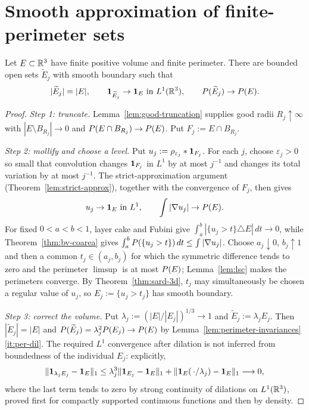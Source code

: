 \chapter{Smooth approximation of finite-perimeter sets}\label{ch:smooth-approx}

\begin{theorem}
\label{thm:smooth-approx}
Let $E\subset\mathbb R^3$ have finite positive volume and finite perimeter.  There
are bounded open sets $\widetilde E_j$ with smooth boundary such that
\[
  |\widetilde E_j|=|E|,
  \qquad
  \mathbf 1_{\widetilde E_j}\to\mathbf 1_{E}\ \text{in }L^1(\mathbb R^3),
  \qquad
  P(\widetilde E_j)\to P(E).
\]
\end{theorem}

\begin{proof}
\emph{Step 1: truncate.}  Lemma~\ref{lem:good-truncation} supplies good radii
$R_j\uparrow\infty$ with $|E\setminus B_{R_j}|\to0$ and
$P(E\cap B_{R_j})\to P(E)$.  Put $F_j:=E\cap B_{R_j}$.

\emph{Step 2: mollify and choose a level.}  Put
$u_j:=\rho_{\varepsilon_j}*\mathbf 1_{F_j}$.  For each $j$, choose
$\varepsilon_j>0$ so small that convolution changes $\mathbf 1_{F_j}$ in $L^1$ by
at most $j^{-1}$ and changes its total variation by at most $j^{-1}$.
The strict-approximation argument (Theorem~\ref{lem:strict-approx}), together
with the convergence of $F_j$, then gives
\begin{equation}\label{eq:smooth-approx-strict}
  u_j\to\mathbf 1_{E}\ \text{in }L^1,\qquad\int|\nabla u_j|\to P(E).
\end{equation}
For fixed $0<a<b<1$, layer cake and Fubini give
$\int_a^b|\{u_j>t\}\triangle E|\,dt\to0$, while
Theorem~\ref{thm:bv-coarea} gives
$\int_a^bP(\{u_j>t\})\,dt\le\int|\nabla u_j|$.  Choose $a_j\downarrow0$,
$b_j\uparrow1$ and then a common $t_j\in(a_j,b_j)$ for which the symmetric
difference tends to zero and the perimeter $\limsup$ is at most $P(E)$;
Lemma~\ref{lem:lsc} makes the perimeters converge.  By
Theorem~\ref{thm:sard-3d}, $t_j$ may simultaneously be chosen a regular value
of $u_j$, so $E_j:=\{u_j>t_j\}$ has smooth boundary.

\emph{Step 3: correct the volume.}  Put
$\lambda_j:=(|E|/|E_j|)^{1/3}\to1$ and
$\widetilde E_j:=\lambda_jE_j$.  Then $|\widetilde E_j|=|E|$ and
$P(\widetilde E_j)=\lambda_j^2P(E_j)\to P(E)$ by
Lemma~\ref{lem:perimeter-invariances}\ref{it:per-dil}.  The required $L^1$
convergence after dilation is not inferred from boundedness of the individual
$E_j$: explicitly,
\[
 \|\mathbf 1_{\lambda_jE_j}-\mathbf 1_{E}\|_1
 \le \lambda_j^3\|\mathbf 1_{E_j}-\mathbf 1_{E}\|_1
      +\|\mathbf 1_{E}(\,\cdot/\lambda_j)-\mathbf 1_{E}\|_1\longrightarrow0,
\]
where the last term tends to zero by strong continuity of dilations on
$L^1(\mathbb R^3)$, proved first for compactly supported continuous functions and
then by density.
\end{proof}


